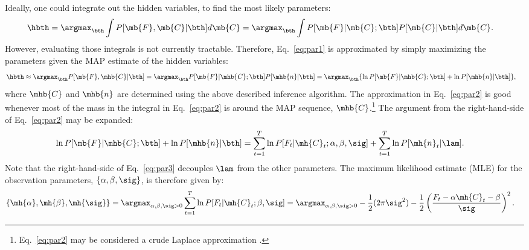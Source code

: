 Ideally, one could integrate out the hidden variables, to find the most likely parameters:
\begin{align} \label{eq:par1}
\hbth &= \argmax_{\bth} \int P[\mb{F}, \mb{C} | \bth] d\mb{C}  = \argmax_{\bth} \int P[\mb{F} | \mb{C}; \bth] P[\mb{C} | \bth] d\mb{C}.
\end{align}
However, evaluating those integrals is not currently tractable.
Therefore, Eq.~\eqref{eq:par1} is approximated by simply maximizing the parameters given the MAP estimate of the hidden variables:
\begin{align} \label{eq:par2}
\hbth &\approx \argmax_{\bth} P[\mb{F}, \mhb{C} | \bth] = \argmax_{\bth} P[\mb{F}| \mhb{C}; \bth] P[\mhb{n} | \bth] = \argmax_{\bth} \{ \ln P[\mb{F} | \mhb{C}; \bth] + \ln P[\mhb{n} | \bth] \}, 
\end{align}
\noindent where $\mhb{C}$ and $\mhb{n}$ are determined using the above described inference algorithm. The approximation in Eq.~\eqref{eq:par2} is good whenever most of the mass in the integral in Eq.~\eqref{eq:par2} is around the MAP sequence, $\mhb{C}$.\footnote{Eq.~\eqref{eq:par2} may be considered a crude Laplace approximation \cite{KassRaftery95}.}  The argument from the right-hand-side of Eq.~\eqref{eq:par2} may be expanded: 
\begin{align} \label{eq:par3}
\ln P[\mb{F}| \mhb{C}; \bth] + \ln P[\mhb{n} | \bth] &= \sum_{t=1}^T \ln P[F_t | \mh{C}_t; \alpha, \beta,\sig] + \sum_{t=1}^T \ln P[\mh{n}_t | \lam].
\end{align}
\noindent Note that the right-hand-side of Eq.~\eqref{eq:par3} decouples $\lam$ from the other parameters.  The maximum likelihood estimate (MLE) for the observation parameters, $\{\alpha,\beta,\sig\}$, is therefore given by:
\begin{align} \label{eq:beta,sig}
	\{\mh{\alpha}, \mh{\beta},\mh{\sig}\} &=  \argmax_{\alpha, \beta,\sig >0} \sum_{t=1}^T \ln P[F_t | \mh{C}_t; \beta,\sig]
	=  \argmax_{\alpha, \beta,\sig >0} 	-\frac{1}{2} (2\pi \sig^2) - \frac{1}{2} \left(\frac{F_t-\alpha \mh{C}_t -\beta}{\sig}\right)^2. %
\end{align}
